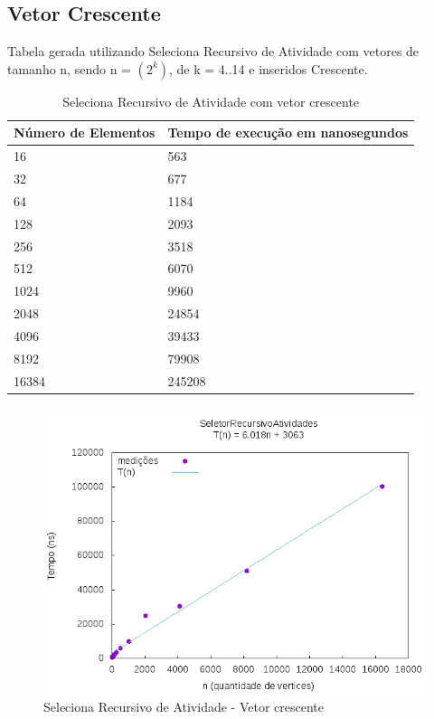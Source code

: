 \documentclass[12pt,a4paper,twoside]{report}
\begin{document}
\subsection{Vetor Crescente}
Tabela gerada utilizando Seleciona Recursivo de Atividade com vetores de tamanho n, sendo n = $(2^k)$, de k = 4..14 e inseridos Crescente.
\begin{table}[H]
\centering
\caption{Seleciona Recursivo de Atividade com vetor crescente}
\label{my-label}
\begin{tabular}{|l|l|}
\hline
\multicolumn{1}{|c|}{\textbf{Número de Elementos}} & \multicolumn{1}{c|}{\textbf{Tempo de execução em nanosegundos}} \\ \hline
16 & 563 \\ \hline
32 & 677 \\ \hline
64 & 1184 \\ \hline
128 & 2093 \\ \hline
256 & 3518 \\ \hline
512 & 6070 \\ \hline
1024 & 9960 \\ \hline
2048 & 24854 \\ \hline
4096 & 39433 \\ \hline
8192 & 79908 \\ \hline
16384 & 245208 \\ \hline

\end{tabular}
\end{table}

\begin{figure}[H]
    \centering
    \includegraphics[width=0.7\linewidth]{graficos/SeletorRecursivoAtividades/Crescente/SelecionaAleatorizado.png}
  \caption{Seleciona Recursivo de Atividade - Vetor crescente}
\end{figure}
\end{document}
